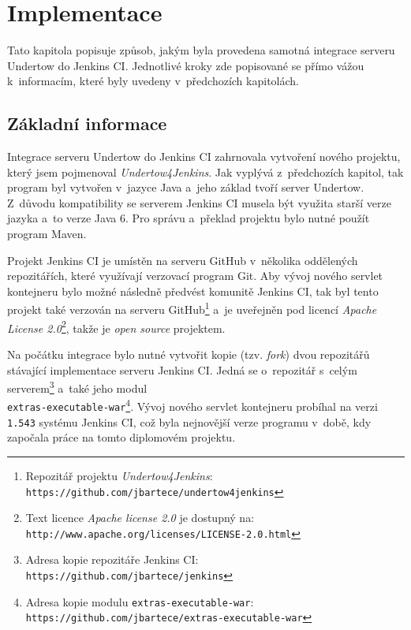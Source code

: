 \chapter{Implementace}  \label{kapImpl}
    Tato kapitola popisuje způsob, jakým byla provedena samotná integrace serveru Undertow do Jenkins CI.
    Jednotlivé kroky zde popisované se přímo vážou k~informacím, které byly uvedeny v~předchozích kapitolách.

    

    
    \section{Základní informace}
        Integrace serveru Undertow do Jenkins CI zahrnovala vytvoření nového projektu, který 
        jsem pojmenoval \emph{Undertow4Jenkins}. 
        Jak vyplývá z~předchozích kapitol, tak program byl vytvořen v~jazyce Java a~jeho základ 
        tvoří server Undertow. 
        Z~důvodu kompatibility se serverem Jenkins CI musela být využita starší verze jazyka a~to verze Java 6.
        Pro správu a~překlad projektu bylo nutné použít program Maven. 
        
        Projekt Jenkins CI je umístěn na serveru GitHub v~několika oddělených repozitářích, které
        využívají verzovací program Git. Aby vývoj nového servlet kontejneru bylo možné následně předvést 
        komunitě Jenkins CI, tak byl tento projekt také verzován na serveru 
        GitHub\footnote{Repozitář projektu \emph{Undertow4Jenkins}: \texttt{https://github.com/jbartece/undertow4jenkins}} 
        a~je uveřejněn pod licencí \emph{Apache License 2.0}\footnote{Text licence \emph{Apache license 2.0} je dostupný na: 
        \texttt{http://www.apache.org/licenses/LICENSE-2.0.html}}, takže je \emph{open source} projektem.

        Na počátku integrace bylo nutné vytvořit kopie (tzv. \emph{fork}) dvou repozitářů stávající implementace serveru Jenkins CI.
        Jedná se o~repozitář s~celým serverem\footnote{Adresa kopie repozitáře Jenkins CI: 
        \texttt{https://github.com/jbartece/jenkins}} a~také jeho modul 
        \\\texttt{extras-executable-war}\footnote{Adresa kopie modulu \texttt{extras-executable-war}:
        \texttt{https://github.com/jbartece/extras-executable-war} }.
        Vývoj nového servlet kontejneru probíhal na verzi \texttt{1.543} systému Jenkins CI, což byla nejnovější verze
        programu v~době, kdy započala práce na tomto diplomovém projektu. 
        
